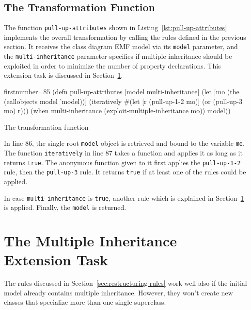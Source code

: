 \documentclass[11pt]{article}
\begin{document}
\subsection{The Transformation Function}
\label{sec:transf-funct}

The function \verb|pull-up-attributes| shown in
Listing~\ref{lst:pull-up-attributes} implements the overall transformation by
calling the rules defined in the previous section.  It receives the class
diagram EMF model via its \verb|model| parameter, and the
\verb|multi-inheritance| parameter specifies if multiple inheritance should be
exploited in order to minimize the number of property declarations.  This
extension task is discussed in Section~\ref{sec:extension-task}.

\begin{listing}[htbp]
  \begin{clojurecode*}{firstnumber=85}
(defn pull-up-attributes [model multi-inheritance]
  (let [mo (the (eallobjects model 'model))]
    (iteratively #(let [r (pull-up-1-2 mo)]
                    (or (pull-up-3 mo) r)))
    (when multi-inheritance (exploit-multiple-inheritance mo))
    model))
  \end{clojurecode*}
  \caption{The transformation function}
    \label{lst:pull-up-attributes}
\end{listing}

In line 86, the single root \verb|model| object is retrieved and bound to the
variable \verb|mo|.  The function \verb|iteratively| in line 87 takes a
function and applies it as long as it returns \verb|true|.  The anonymous
function given to it first applies the \verb|pull-up-1-2| rule, then the
\verb|pull-up-3| rule.  It returns \verb|true| if at least one of the rules
could be applied.

In case \verb|multi-inheritance| is \verb|true|, another rule which is
explained in Section~\ref{sec:extension-task} is applied.  Finally, the
\verb|model| is returned.



\section{The Multiple Inheritance Extension Task}
\label{sec:extension-task}

The rules discussed in Section~\ref{sec:restructuring-rules} work well also if
the initial model already contains multiple inheritance.  However, they won't
create new classes that specialize more than one single superclass.
\end{document}
